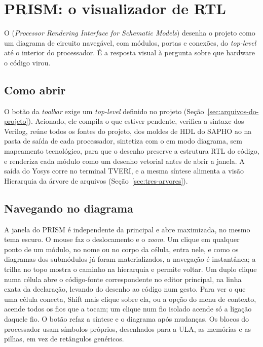 \chapter{PRISM: o visualizador de RTL}
\label{cap:prism}

O  (\textit{Processor Rendering Interface for Schematic Models}) desenha o projeto como um diagrama de circuito navegável, com módulos, portas e conexões, do \textit{top-level} até o interior do processador. É a resposta visual à pergunta sobre que hardware o código virou.


\section{Como abrir}

O botão  da \textit{toolbar} exige um \textit{top-level} definido no projeto (Seção~\ref{sec:arquivos-do-projeto}). Acionado, ele compila o que estiver pendente, verifica a sintaxe dos Verilog, reúne todos os fontes do projeto, dos moldes de HDL do SAPHO ao  na pasta de saída de cada processador, sintetiza com o  em modo diagrama, sem mapeamento tecnológico, para que o desenho preserve a estrutura RTL do código, e renderiza cada módulo como um desenho vetorial antes de abrir a janela. A saída do Yosys corre no terminal TVERI, e a mesma síntese alimenta a visão Hierarquia da árvore de arquivos (Seção~\ref{sec:tres-arvores}).

\section{Navegando no diagrama}

A janela do PRISM é independente da principal e abre maximizada, no mesmo tema escuro. O mouse faz o deslocamento e o \textit{zoom}. Um clique em qualquer ponto de um módulo, no nome ou no corpo da célula, entra nele, e como os diagramas dos submódulos já foram materializados, a navegação é instantânea; a trilha no topo mostra o caminho na hierarquia e permite voltar. Um duplo clique numa célula abre o código-fonte correspondente no editor principal, na linha exata da declaração, levando do desenho ao código num gesto. Para ver o que uma célula conecta, Shift mais clique sobre ela, ou a opção  do menu de contexto, acende todos os fios que a tocam; um clique num fio isolado acende só a ligação daquele fio. O botão  refaz a síntese e o diagrama após mudanças. Os blocos do processador usam símbolos próprios, desenhados para a ULA, as memórias e as pilhas, em vez de retângulos genéricos.

